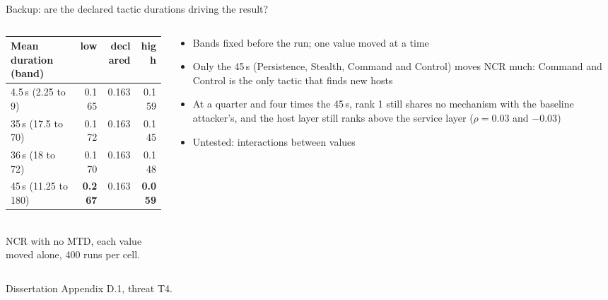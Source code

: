\documentclass[aspectratio=169,11pt]{beamer}
\begin{document}
\begin{frame}{Backup: are the declared tactic durations driving the result?}
\begin{columns}[T]
\begin{column}{0.48\textwidth}
\small
\begin{tabular}{@{}l r r r@{}}
\toprule
Mean duration (band) & low & declared & high \\
\midrule
4.5\,s (2.25 to 9) & 0.165 & 0.163 & 0.159 \\
35\,s (17.5 to 70) & 0.172 & 0.163 & 0.145 \\
36\,s (18 to 72) & 0.170 & 0.163 & 0.148 \\
45\,s (11.25 to 180) & \textbf{0.267} & 0.163 & \textbf{0.059} \\
\bottomrule
\end{tabular}\\[1mm]
{\scriptsize NCR with no MTD, each value moved alone, 400 runs per cell.}
\end{column}
\begin{column}{0.48\textwidth}
\begin{itemize}
  \item Bands fixed before the run; one value moved at a time
  \item Only the 45\,s (Persistence, Stealth, Command and Control) moves NCR much: Command and Control is the only tactic that finds new hosts
  \item At a quarter and four times the 45\,s, rank 1 still shares no mechanism with the baseline attacker's, and the host layer still ranks above the service layer ($\rho = 0.03$ and $-0.03$)
  \item Untested: interactions between values
\end{itemize}
\end{column}
\end{columns}
\vfill{\scriptsize Dissertation Appendix D.1, threat T4.}
\end{frame}
\end{document}
